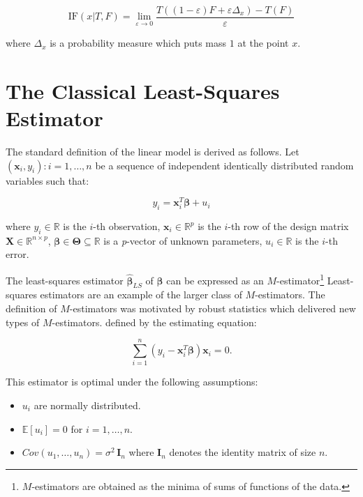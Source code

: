\documentclass[]{book}
\providecommand{\tightlist}{%
  \setlength{\itemsep}{0pt}\setlength{\parskip}{0pt}}
\let\rmarkdownfootnote\footnote%
\def\footnote{\protect\rmarkdownfootnote}
\theoremstyle{definition}
\theoremstyle{definition}
\theoremstyle{definition}
\theoremstyle{remark}
\begin{document}
{\[\text{IF}(x| T, F) = \lim_{\varepsilon \rightarrow 0} \frac{T\left((1-\varepsilon) F + \varepsilon \Delta_x \right) - T\left(F\right)}{\varepsilon}\]

where \(\Delta_x\) is a probability measure which puts mass \(1\) at the
point \(x\).

\hypertarget{the-classical-least-squares-estimator}{%
\section{The Classical Least-Squares
Estimator}\label{the-classical-least-squares-estimator}}

The standard definition of the linear model is derived as follows. Let
\({(\mathbf{x}_{i},y_{i}): i = 1, \ldots, n}\) be a sequence of
independent identically distributed random variables such that:

\[y_{i} = \mathbf{x}_{i}^{T} {\boldsymbol{\beta}} + u_{i}\]

where \(y_{i} \in \mathbb{R}\) is the \(i\)-th observation,
\(\mathbf{x}_{i} \in \mathbb{R}^{p}\) is the \(i\)-th row of the design
matrix \(\mathbf{X} \in \mathbb{R}^{n\times p}\),
\(\boldsymbol{\beta} \in \boldsymbol{\Theta} \subseteq \mathbb{R}\) is a
\emph{p}-vector of unknown parameters, \(u_{i} \in \mathbb{R}\) is the
\(i\)-th error.

The least-squares estimator \(\hat{\boldsymbol{\beta}}_{LS}\) of
\(\boldsymbol{\beta}\) can be expressed as an \(M\)-estimator\footnote{\(M\)-estimators
  are obtained as the minima of sums of functions of the data.}
Least-squares estimators are an example of the larger class of
\(M\)-estimators. The definition of \(M\)-estimators was motivated by
robust statistics which delivered new types of \(M\)-estimators. defined
by the estimating equation:

\begin{equation}
  \sum_{i = 1}^{n} \left(y_{i} - \mathbf{x}_{i}^{T} \boldsymbol{\beta} \right)\mathbf{x}_{i} = 0.
    \label{eq:lsMestim2}
\end{equation}

This estimator is optimal under the following assumptions:

\begin{itemize}
\tightlist
\item
  \(u_{i}\) are normally distributed.
\item
  \(\mathbb{E}[u_{i}] = 0\) for \(i = 1, \ldots, n\).
\item
  \(Cov(u_{1}, \ldots, u_{n}) = \sigma^2 \, \mathbf{I}_{n}\) where
  \(\mathbf{I}_{n}\) denotes the identity matrix of size \(n\).
\end{itemize}

}
\end{document}
